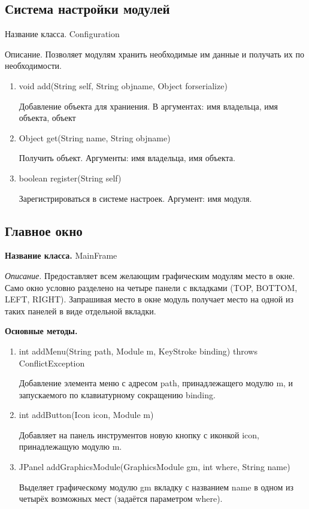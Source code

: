\documentclass[12pt]{article}
\begin{document}
\subsection{Система настройки модулей}


Название класса. Configuration

Описание. Позволяет модулям хранить необходимые им данные и получать их по необходимости.
\begin{enumerate}
\item void add(String self, String objname, Object forserialize)

Добавление объекта для храниения. В аргументах: имя владельца, имя объекта, объект

\item Object get(String name, String objname)

Получить объект. Аргументы: имя владельца, имя объекта.
\item boolean register(String self)

Зарегистрироваться в системе настроек. Аргумент: имя модуля.
\end{enumerate}

\subsection{Главное окно}

{\bf Название класса.} MainFrame

\textit{Описание.} Предоставляет всем желающим графическим модулям место в окне. Само окно условно разделено на четыре панели с вкладками (TOP, BOTTOM, LEFT, RIGHT). Запрашивая место в окне модуль получает место на одной из таких панелей в виде отдельной вкладки.

\textbf{Основные методы.} 

\begin{enumerate}

\item int addMenu(String path, Module m, KeyStroke binding) throws ConflictException

Добавление элемента меню с адресом path, принадлежащего модулю m, и запускаемого по клавиатурному сокращению binding.
\item int addButton(Icon icon, Module m)

Добавляет на панель инструментов новую кнопку с иконкой icon, принадлежащую модулю m.
\item JPanel addGraphicsModule(GraphicsModule gm, int where, String name)

Выделяет графическому модулю gm вкладку с названием name в одном из четырёх возможных мест (задаётся параметром where).
\end{enumerate}
\end{document}
